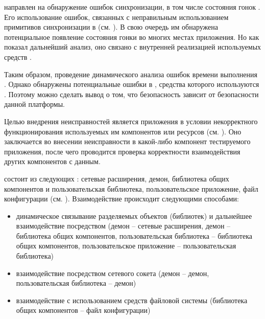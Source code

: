 %
 направлен на обнаружение ошибок синхронизации, в том числе состояния гонок . 
%
Его использование  ошибок, связанных с неправильным использованием примитивов синхронизации в  (см. ). 
%
В свою очередь им обнаружена потенциальное появление состояния гонки во многих местах приложения. 
%
Но как показал дальнейший анализ, оно связано с внутренней реализацией используемых средств . 

%
Таким образом, проведение динамического анализа  ошибок времени выполнения . 
%
Однако обнаружены потенциальные ошибки в , средства которого используются . 
%
Поэтому можно сделать вывод о том, что безопасность  зависит от безопасности данной платформы.  



%
Целью внедрения неисправностей является  приложения в условии некорректного функционирования используемых им компонентов или ресурсов (см. ). 
%
Оно заключается во внесении неисправности в какой-либо компонент тестируемого приложения, после чего проводится проверка корректности взаимодействия других компонентов с данным. 

%
 состоит из следующих : сетевые расширения, демон, библиотека общих компонентов и пользовательская библиотека, пользовательское приложение, файл конфигурации (см. ). 
%
Взаимодействие происходит следующими способами:
\begin{itemize}
	\setlength{\itemsep}{0pt}%

	\item динамическое связывание разделяемых объектов (библиотек) и дальнейшее взаимодействие посредством  (демон -- сетевые расширения, демон -- библиотека общих компонентов, пользовательская библиотека -- библиотека общих компонентов, пользовательское приложение -- пользовательская библиотека)
	\item взаимодействие посредством сетевого сокета (демон -- демон, пользовательская библиотека -- демон)
	\item взаимодействие с использованием средств файловой системы (библиотека общих компонентов -- файл конфигурации)
\end{itemize}

